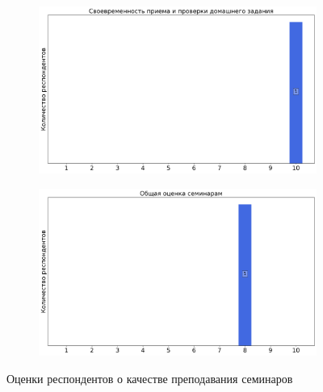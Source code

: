 \begin{figure}[H]
\begin{subfigure}[b]{0.45\textwidth}
                \includegraphics[width=\textwidth]{images/3 course/Теория поля/seminarists-marks-Толоконников С.В.-2.png}
            \end{subfigure}
            \begin{subfigure}[b]{0.45\textwidth}
                \centering
                \includegraphics[width=\textwidth]{images/3 course/Теория поля/seminarists-marks-Толоконников С.В.-3.png}
            \end{subfigure}	
            \caption{Оценки респондентов о качестве преподавания семинаров}
        \end{figure}

        
